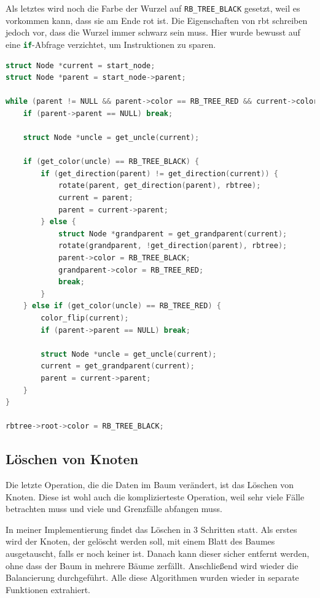 \documentclass[11pt]{article}
\newcommand{\lstin}[1]{\lstinline[language=C]{#1}}
\begin{document}
Als letztes wird noch die Farbe der Wurzel auf \lstin{RB_TREE_BLACK} gesetzt, weil es vorkommen kann,
dass sie am Ende rot ist. Die Eigenschaften von \gls{rbt} schreiben jedoch vor, dass die Wurzel immer schwarz sein muss.
Hier wurde bewusst auf eine \lstin{if}-Abfrage verzichtet, um Instruktionen zu sparen.

\begin{lstlisting}[language=C]
struct Node *current = start_node;
struct Node *parent = start_node->parent;

while (parent != NULL && parent->color == RB_TREE_RED && current->color == RB_TREE_RED) {
    if (parent->parent == NULL) break;

    struct Node *uncle = get_uncle(current);

    if (get_color(uncle) == RB_TREE_BLACK) {
        if (get_direction(parent) != get_direction(current)) {
            rotate(parent, get_direction(parent), rbtree);
            current = parent;
            parent = current->parent;
        } else {
            struct Node *grandparent = get_grandparent(current);
            rotate(grandparent, !get_direction(parent), rbtree);
            parent->color = RB_TREE_BLACK;
            grandparent->color = RB_TREE_RED;
            break;
        }
    } else if (get_color(uncle) == RB_TREE_RED) {
        color_flip(current);
        if (parent->parent == NULL) break;

        struct Node *uncle = get_uncle(current);
        current = get_grandparent(current);
        parent = current->parent;
    }
}

rbtree->root->color = RB_TREE_BLACK;

\end{lstlisting}

\pagebreak

\subsection{Löschen von Knoten}

Die letzte Operation, die die Daten im Baum verändert, ist das Löschen von Knoten.
Diese ist wohl auch die komplizierteste Operation, weil sehr viele Fälle betrachten
muss und viele und Grenzfälle abfangen muss.

In meiner Implementierung findet das Löschen in 3 Schritten statt. Als erstes wird der Knoten, der gelöscht werden soll,
mit einem Blatt des Baumes ausgetauscht, falls er noch keiner ist. Danach kann dieser sicher entfernt werden, ohne dass der Baum
in mehrere Bäume zerfällt. Anschließend wird wieder die Balancierung durchgeführt.
Alle diese Algorithmen wurden wieder in separate Funktionen extrahiert.
\end{document}
